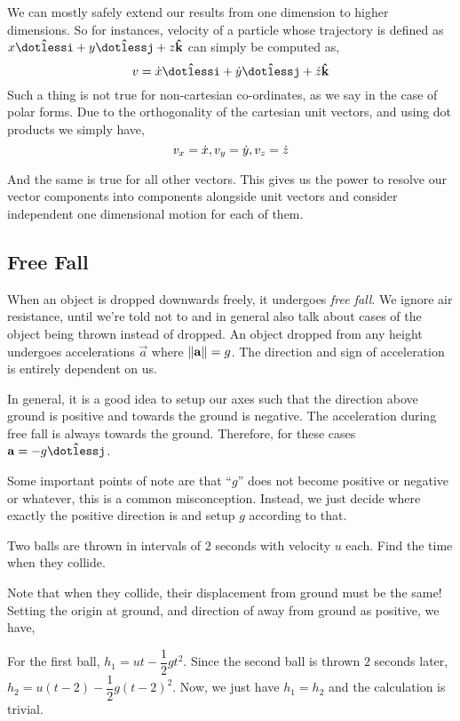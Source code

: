 We can mostly safely extend our results from one dimension to higher dimensions.
So for instances, velocity of a particle whose trajectory is defined as 
\(x\ihat + y\jhat + z\khat\) can simply be computed as,
\[v = \ndiv{x}\ihat + \ndiv{y}\jhat + \ndiv{z}\khat\] Such a thing
is not true for non-cartesian co-ordinates, as we say in the case of polar forms.
Due to the orthogonality of the cartesian unit vectors, and using dot products
we simply have, 
\[v_x = \dot{x}, v_y = \dot{y}, v_z = \dot{z}\]


And the same is true for all other vectors. This gives us the power to
resolve our vector components into components alongside unit vectors
and consider independent one dimensional motion for each of them.

\subsection{Free Fall}

When an object is dropped downwards freely, it undergoes \emph{free fall}. We ignore
air resistance, until we're told not to and in general also talk about cases of the
object being thrown instead of dropped. An object dropped from any height undergoes
accelerations \(\vec{a}\) where \(\norm{\boldsymbol{\mathbf{a}}} = g\). The direction and sign of acceleration
is entirely dependent on us.

In general, it is a good idea to setup our axes such that the direction above ground is positive
and towards the ground is negative. The acceleration during free fall is always towards
the ground. Therefore, for these cases \(\vec{a} = -g \jhat\). 

Some important points of note are that ``\(g\)'' does not become positive or negative or whatever,
this is a common misconception. Instead, we just decide where exactly the positive direction is
and setup \(g\) according to that.

\begin{example}
    Two balls are thrown in intervals of \(2\) seconds with velocity \(u\) each. Find the
    time when they collide.
    \begin{soln}
        Note that when they collide, their displacement from ground must be the same! Setting 
        the origin at ground, and direction of away from ground as positive, we have,
        
        For the first ball, \(h_{1} = ut - \dfrac{1}{2}gt^2\). Since the second ball
        is thrown \(2\) seconds later, \(h_{2} = u(t-2) - \dfrac{1}{2}g(t-2)^2\). Now, we just have
        \(h_{1} = h_{2}\) and the calculation is trivial.
    \end{soln}
\end{example}

